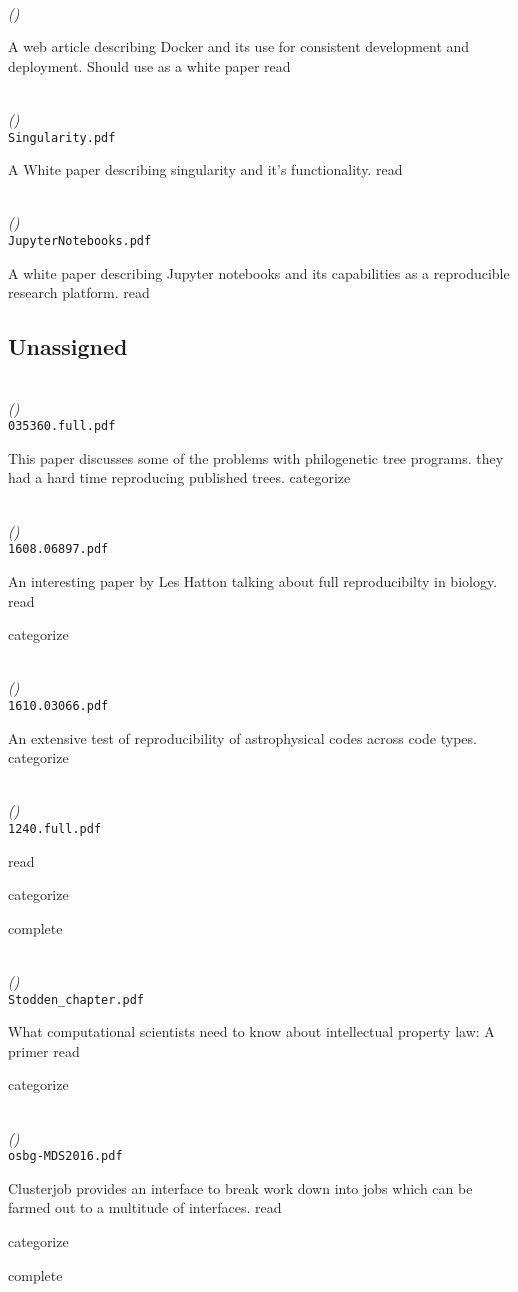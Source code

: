 \documentclass{article}
\newcommand{\Read}{
	\gls{read}
}
\newcommand{\categorize}{
	\gls{categorize}
}
\newcommand{\complete}{
	\gls{complete}
}
\newenvironment{refdef}[2] {
	\noindent \textbf{\citetitle{#1}} \cite{#1}\\ \citejournalorbooktitle{#1} \textit{(\citeyear{#1})}\\ \texttt{#2} \vspace{0.2in} \par 
} {
\vspace{0.2in}
}
\begin{document}
\begin{refdef}{Docker}{}
A web article describing Docker and its use for consistent development and deployment. Should use as a white paper \Read
\end{refdef}

\begin{refdef}{Singularity}{Singularity.pdf}
A White paper describing singularity and it's functionality. \Read
\end{refdef}

\begin{refdef}{Jupyter}{JupyterNotebooks.pdf}
A white paper describing Jupyter notebooks and its capabilities as a reproducible research platform. \Read
\end{refdef}


\subsection{Unassigned}


\begin{refdef}{Czech035360}{035360.full.pdf}
This paper discusses some of the problems with philogenetic tree programs. they had a hard time reproducing published trees. \categorize
\end{refdef}

\begin{refdef}{leshatton-full-repro}{1608.06897.pdf}
An interesting paper by Les Hatton talking about full reproducibilty in biology. \Read \categorize
\end{refdef}

\begin{refdef}{AGORA-II}{1610.03066.pdf}
An extensive test of reproducibility of astrophysical codes across code types. \categorize
\end{refdef}

\begin{refdef}{Stodden1240}{1240.full.pdf}
\Read \categorize \complete
\end{refdef}

\begin{refdef}{stodden-legal}{Stodden\_chapter.pdf}
What computational scientists need to know about intellectual property law: A primer \Read \categorize
\end{refdef}

\begin{refdef}{clusterjob}{osbg-MDS2016.pdf}
Clusterjob provides an interface to break work down into jobs which can be farmed out to a multitude of interfaces. \Read \categorize \complete
\end{refdef}
\end{document}
